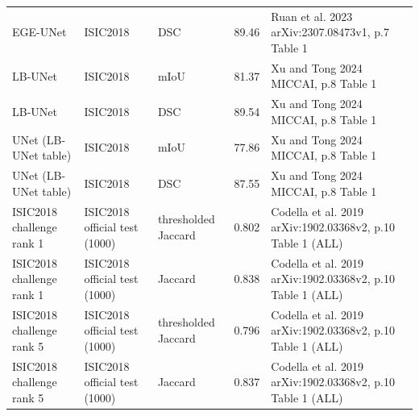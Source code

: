 \begin{tabular}{p{3.2cm}p{2.4cm}p{2.2cm}rp{5.2cm}}
EGE-UNet & ISIC2018 & DSC & 89.46 & Ruan et al. 2023 arXiv:2307.08473v1, p.7 Table 1 \\
LB-UNet & ISIC2018 & mIoU & 81.37 & Xu and Tong 2024 MICCAI, p.8 Table 1 \\
LB-UNet & ISIC2018 & DSC & 89.54 & Xu and Tong 2024 MICCAI, p.8 Table 1 \\
UNet (LB-UNet table) & ISIC2018 & mIoU & 77.86 & Xu and Tong 2024 MICCAI, p.8 Table 1 \\
UNet (LB-UNet table) & ISIC2018 & DSC & 87.55 & Xu and Tong 2024 MICCAI, p.8 Table 1 \\
ISIC2018 challenge rank 1 & ISIC2018 official test (1000) & thresholded Jaccard & 0.802 & Codella et al. 2019 arXiv:1902.03368v2, p.10 Table 1 (ALL) \\
ISIC2018 challenge rank 1 & ISIC2018 official test (1000) & Jaccard & 0.838 & Codella et al. 2019 arXiv:1902.03368v2, p.10 Table 1 (ALL) \\
ISIC2018 challenge rank 5 & ISIC2018 official test (1000) & thresholded Jaccard & 0.796 & Codella et al. 2019 arXiv:1902.03368v2, p.10 Table 1 (ALL) \\
ISIC2018 challenge rank 5 & ISIC2018 official test (1000) & Jaccard & 0.837 & Codella et al. 2019 arXiv:1902.03368v2, p.10 Table 1 (ALL) \\
\bottomrule
\end{tabular}

